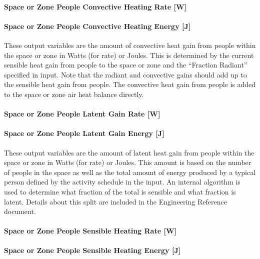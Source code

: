 \paragraph{Space or Zone People Convective Heating Rate {[}W{]}}\label{zone-people-convective-heating-rate-w}

\paragraph{Space or Zone People Convective Heating Energy {[}J{]}}\label{zone-people-convective-heating-energy-j}

These output variables are the amount of convective heat gain from people within the space or zone in Watts (for rate) or Joules. This is determined by the current sensible heat gain from people to the space or zone and the ``Fraction Radiant'' specified in input. Note that the radiant and convective gains should add up to the sensible heat gain from people. The convective heat gain from people is added to the space or zone air heat balance directly.

\paragraph{Space or Zone People Latent Gain Rate {[}W{]}}\label{zone-people-latent-gain-rate-w}

\paragraph{Space or Zone People Latent Gain Energy {[}J{]}}\label{zone-people-latent-gain-energy-j}

These output variables are the amount of latent heat gain from people within the space or zone in Watts (for rate) or Joules. This amount is based on the number of people in the space as well as the total amount of energy produced by a typical person defined by the activity schedule in the input. An internal algorithm is used to determine what fraction of the total is sensible and what fraction is latent. Details about this split are included in the Engineering Reference document.

\paragraph{Space or Zone People Sensible Heating Rate {[}W{]}}\label{zone-people-sensible-heating-rate-w}

\paragraph{Space or Zone People Sensible Heating Energy {[}J{]}}\label{zone-people-sensible-heating-energy-j}

